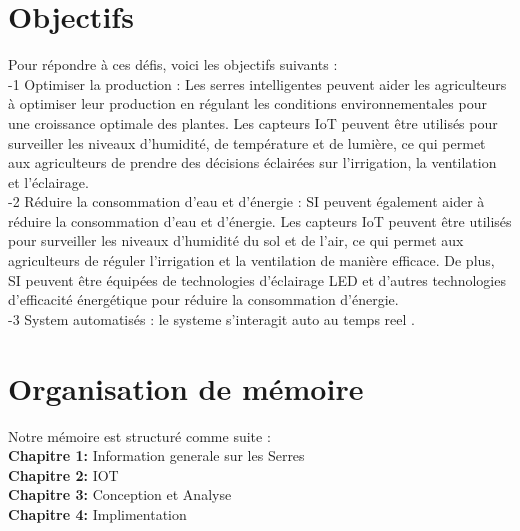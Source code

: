 \section*{Objectifs }
Pour répondre à ces défis, voici les objectifs suivants :
\\
-1 Optimiser la production : Les serres intelligentes peuvent aider les agriculteurs à optimiser leur production en régulant les conditions environnementales pour une croissance optimale des plantes. Les capteurs IoT peuvent être utilisés pour surveiller les niveaux d'humidité, de température et de lumière, ce qui permet aux agriculteurs de prendre des décisions éclairées sur l'irrigation, la ventilation et l'éclairage.
\\
-2 Réduire la consommation d'eau et d'énergie : SI peuvent également aider à réduire la consommation d'eau et d'énergie. Les capteurs IoT peuvent être utilisés pour surveiller les niveaux d'humidité du sol et de l'air, ce qui permet aux agriculteurs de réguler l'irrigation et la ventilation de manière efficace. De plus, SI peuvent être équipées de technologies d'éclairage LED et d'autres technologies d'efficacité énergétique pour réduire la consommation d'énergie.
\\
-3 System automatisés : le systeme s'interagit auto au temps reel . 
\section*{Organisation de mémoire }
Notre mémoire est structuré comme suite : 
\\
\textbf{Chapitre 1: }
Information generale sur les Serres 
\\
\textbf{Chapitre 2: }
IOT
\\
\textbf{Chapitre 3: }
Conception et Analyse
\\
\textbf{Chapitre 4: }
Implimentation